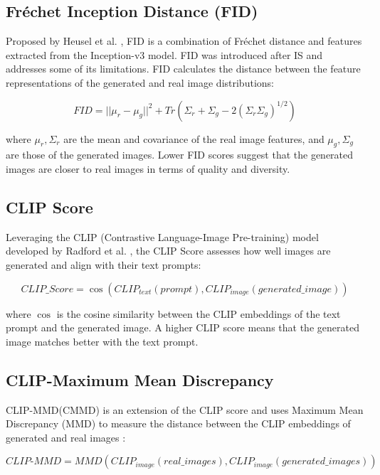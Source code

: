 \documentclass{article}
\begin{document}
\subsection{Fréchet Inception Distance (FID)}

Proposed by Heusel et al. \cite{heusel2017gans}, FID is a combination of Fréchet distance and features extracted from the 
Inception-v3 model. FID was introduced after IS and addresses some of its limitations.
FID calculates the distance between the feature representations of the generated and real image distributions:

\begin{equation}
    FID = ||\mu_r - \mu_g||^2 + Tr(\Sigma_r + \Sigma_g - 2(\Sigma_r \Sigma_g)^{1/2})
\end{equation}

where $\mu_r, \Sigma_r$ are the mean and covariance of the real image features, and $\mu_g, \Sigma_g$ are those of the generated images.
 Lower FID scores suggest that the generated images are closer to real images in terms of quality and diversity.

\subsection{CLIP Score}

Leveraging the CLIP (Contrastive Language-Image Pre-training) model developed by Radford et al. \cite{radford2021learning}, 
the CLIP Score assesses how well images are generated and align with their text prompts:

\begin{equation}
    CLIP\_Score = \cos(CLIP_{text}(prompt), CLIP_{image}(generated\_image))
\end{equation}

where $\cos$ is the cosine similarity between the CLIP embeddings of the text prompt and the generated image.
A higher CLIP score means that the generated image matches better with the text prompt.

\subsection{CLIP-Maximum Mean Discrepancy}

CLIP-MMD(CMMD) is an extension of the CLIP score and uses Maximum Mean Discrepancy (MMD) to measure the distance between the 
CLIP embeddings of generated and real images \cite{gao2022measuring}:

\begin{equation}
    CLIP\text{-}MMD = MMD(CLIP_{image}(real\_images), CLIP_{image}(generated\_images))
\end{equation}
\end{document}

